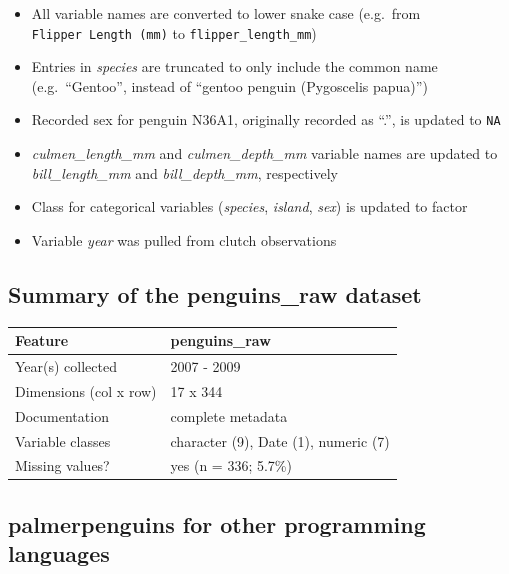 \begin{itemize}
\tightlist
\item
  All variable names are converted to lower snake case (e.g.~from
  \texttt{Flipper\ Length\ (mm)} to \texttt{flipper\_length\_mm})
\item
  Entries in \emph{species} are truncated to only include the common
  name (e.g.~``Gentoo'', instead of ``gentoo penguin (Pygoscelis
  papua)'')
\item
  Recorded sex for penguin N36A1, originally recorded as ``.'', is
  updated to \texttt{NA}
\item
  \emph{culmen\_length\_mm} and \emph{culmen\_depth\_mm} variable names
  are updated to \emph{bill\_length\_mm} and \emph{bill\_depth\_mm},
  respectively
\item
  Class for categorical variables (\emph{species}, \emph{island},
  \emph{sex}) is updated to factor
\item
  Variable \emph{year} was pulled from clutch observations
\end{itemize}

\hypertarget{summary-of-the-penguins_raw-dataset}{%
\subsection{\texorpdfstring{Summary of the \textbf{penguins\_raw}
dataset}{Summary of the penguins\_raw dataset}}\label{summary-of-the-penguins_raw-dataset}}

\begin{Schunk}

\begin{tabular}{ll}
\toprule
Feature & penguins\_raw\\
\midrule
Year(s) collected & 2007 - 2009\\
Dimensions (col x row) & 17 x 344\\
Documentation & complete metadata\\
Variable classes & character (9), Date (1), numeric (7)\\
Missing values? & yes (n = 336; 5.7\%)\\
\bottomrule
\end{tabular}

\end{Schunk}

\hypertarget{palmerpenguins-for-other-programming-languages}{%
\subsection{palmerpenguins for other programming
languages}\label{palmerpenguins-for-other-programming-languages}}

